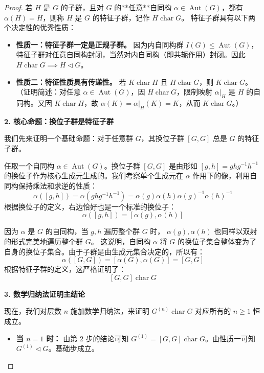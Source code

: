 \documentclass[]{article}
\begin{document}
\begin{proof}
若 $H$ 是 $G$ 的子群，且对 $G$ 的**任意**自同构 $\alpha \in \operatorname{Aut}(G)$，都有 $\alpha(H) = H$，则称 $H$ 是 $G$ 的特征子群，记作 $H \operatorname{char} G$。
特征子群具有以下两个决定性的优秀性质：
\begin{itemize}
	\item \textbf{性质一：特征子群一定是正规子群。}
	因为内自同构群 $I(G) \leqslant \operatorname{Aut}(G)$，特征子群对任意自同构封闭，当然对内自同构（即共轭作用）封闭。因此 $H \operatorname{char} G \implies H \triangleleft G$。
	
	\item \textbf{性质二：特征性质具有传递性。}
	若 $K \operatorname{char} H$ 且 $H \operatorname{char} G$，则 $K \operatorname{char} G$。
	（证明简述：对任意 $\alpha \in \operatorname{Aut}(G)$，因 $H \operatorname{char} G$，限制映射 $\alpha|_H$ 是 $H$ 的自同构。又因 $K \operatorname{char} H$，故 $\alpha(K) = \alpha|_H(K) = K$，从而 $K \operatorname{char} G$。）
\end{itemize}

\bigskip
\noindent \textbf{2. 核心命题：换位子群是特征子群}

我们先来证明一个基础命题：对于任意群 $G$，其换位子群 $[G, G]$ 总是 $G$ 的特征子群。

任取一个自同构 $\alpha \in \operatorname{Aut}(G)$。换位子群 $[G, G]$ 是由形如 $[g, h] = ghg^{-1}h^{-1}$ 的换位子作为核心生成元生成的。我们考察单个生成元在 $\alpha$ 作用下的像，利用自同构保持乘法和求逆的性质：
\[ \alpha([g, h]) = \alpha(ghg^{-1}h^{-1}) = \alpha(g)\alpha(h)\alpha(g)^{-1}\alpha(h)^{-1} \]
根据换位子的定义，右边恰好也是一个标准的换位子：
\[ \alpha([g, h]) = [\alpha(g), \alpha(h)] \]

因为 $\alpha$ 是 $G$ 的自同构，当 $g, h$ 遍历整个群 $G$ 时， $\alpha(g), \alpha(h)$ 也同样以双射的形式完美地遍历整个群 $G$。
这说明，自同构 $\alpha$ 将 $G$ 的换位子集合整体变为了自身的换位子集合。由于子群是由生成元集合决定的，所以有：
\[ \alpha([G, G]) = [\alpha(G), \alpha(G)] = [G, G] \]
根据特征子群的定义，这严格证明了：
\[ [G, G] \operatorname{char} G \]

\bigskip
\noindent \textbf{3. 数学归纳法证明主结论}

现在，我们对层数 $n$ 施加数学归纳法，来证明 $G^{(n)} \operatorname{char} G$ 对应所有的 $n \ge 1$ 恒成立。

\begin{itemize}
	\item \textbf{当 $n = 1$ 时：}
	由第 2 步的结论可知 $G^{(1)} = [G, G] \operatorname{char} G$。由性质一可知 $G^{(1)} \triangleleft G$。基础步成立。
	

\end{itemize}
\end{proof}
\end{document}

